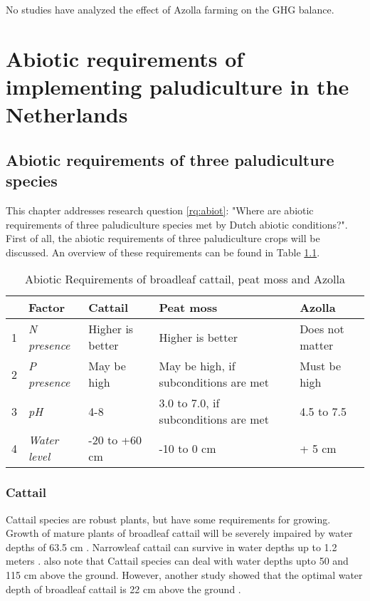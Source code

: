 \documentclass[a4paper,12pt]{scrbook}
\begin{document}
No studies have analyzed the effect of Azolla farming on the GHG balance. 

\chapter{Abiotic requirements of implementing paludiculture in the Netherlands}

\section{Abiotic requirements of three paludiculture species}

This chapter addresses research question \ref{rq:abiot}: "Where are abiotic requirements of three paludiculture species met by Dutch abiotic conditions?". First of all, the abiotic requirements of three paludiculture crops will be discussed. An overview of these requirements can be found in Table \ref{tab:phy}.

\begin{table}[htbp]
\caption{Abiotic Requirements of broadleaf cattail, peat moss and Azolla}
\begin{flushleft}
\begin{tabular}{|r|l|l|l|l|}
\hline
\multicolumn{1}{|l|}{} & \textbf{Factor} & \textbf{Cattail} & \textbf{Peat moss} & \textbf{Azolla} \\ \hline
1 & \textit{N presence} &  Higher is better & Higher is better & Does not matter \\ \hline
2 & \textit{P presence} & May be high & May be high, if subconditions are met & Must be high \\ \hline
3 & \textit{pH} & 4-8 & 3.0 to 7.0, if subconditions are met & 4.5 to 7.5 \\ \hline
4 & \textit{Water level} & -20 to +60 cm & -10 to 0 cm & + 5 cm \\ \hline
\end{tabular}
\end{flushleft}
\label{tab:phy}
\end{table}


\subsection{Cattail}


Cattail species are robust plants, but have some requirements for growing. Growth of mature plants of broadleaf cattail will be severely impaired by water depths of 63.5 cm \citep{morton1975cattails}. Narrowleaf cattail can survive in water depths up to 1.2 meters \citep{morton1975cattails}. \citet{dubbe1988production} also note that Cattail species can deal with water depths upto 50 and 115 cm above the ground. However, another study showed that the optimal water depth of broadleaf cattail is 22 cm above the ground \citep{grace1989effects}.
\end{document}
